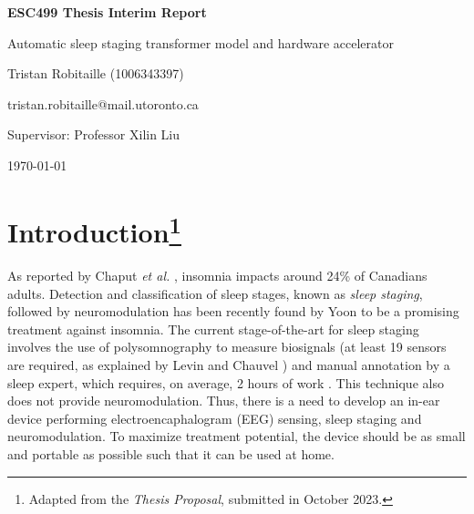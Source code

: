 \documentclass[12pt]{article}
\begin{document}
    \begin{titlepage}
        \centering
        {\LARGE\bfseries ESC499 Thesis Interim Report\par}
        {\Large Automatic sleep staging transformer model and hardware accelerator\par}
        \vspace*{\fill}
        \vspace{1cm}
        {\Large Tristan Robitaille (1006343397)\par}
        {\large tristan.robitaille@mail.utoronto.ca\par}
        \vspace{1cm}
        {\large Supervisor: Professor Xilin Liu\par}
        \vfill
        {\large \today\par}
        \thispagestyle{empty}
    \end{titlepage}

    \newpage
    \doublespacing %

    \pagestyle{fancy}
    \fancyhf{}
    \renewcommand{\headrulewidth}{0pt} %
    \rfoot{\thepage} %
    
    \tableofcontents
    \newpage

    \listoffigures

    \listoftables
    \newpage


    \section[Introduction]{Introduction\footnote{Adapted from the \textit{Thesis Proposal}, submitted in October 2023.}}
    As reported by Chaput \textit{et al.} \cite{insomnia_prevalence}, insomnia impacts around 24\% of Canadians adults. Detection and classification of sleep stages, known as \textit{sleep staging}, followed by neuromodulation has been recently found by Yoon \cite{yoon2021neuromodulation} to be a promising
    treatment against insomnia. The current stage-of-the-art for sleep staging involves the use of polysomnography to measure biosignals (at least 19 sensors are required, as explained by Levin and Chauvel \cite{RUNDO2019381}) and manual annotation by a sleep expert, which requires, on average, 2 hours of work \cite{phan2022automatic}.
    This technique also does not provide neuromodulation. Thus, there is a need to develop an in-ear device performing electroencaphalogram (EEG) sensing, sleep staging and neuromodulation. To maximize treatment potential, the device should be as small and portable as possible such that it can be used at home.
    
\end{document}
